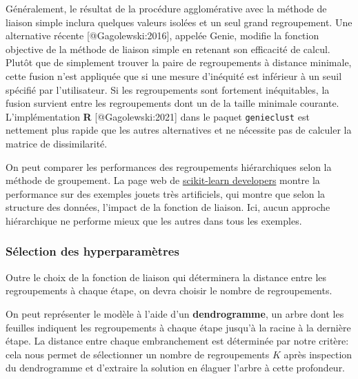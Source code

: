 \documentclass[
  11pt,
  letterpaper,
]{book}
\theoremstyle{definition}
\theoremstyle{remark}
\begin{document}
Généralement, le résultat de la procédure agglomérative avec la méthode
de liaison simple inclura quelques valeurs isolées et un seul grand
regroupement. Une alternative récente {[}@Gagolewski:2016{]}, appelée
Genie, modifie la fonction objective de la méthode de liaison simple en
retenant son efficacité de calcul. Plutôt que de simplement trouver la
paire de regroupements à distance minimale, cette fusion n'est appliquée
que si une mesure d'inéquité est inférieur à un seuil spécifié par
l'utilisateur. Si les regroupements sont fortement inéquitables, la
fusion survient entre les regroupements dont un de la taille minimale
courante. L'implémentation \textbf{R} {[}@Gagolewski:2021{]} dans le
paquet \texttt{genieclust} est nettement plus rapide que les autres
alternatives et ne nécessite pas de calculer la matrice de
dissimilarité.

On peut comparer les performances des regroupements hiérarchiques selon
la méthode de groupement. La page web de
\href{https://scikit-learn.org/stable/auto_examples/cluster/plot_linkage_comparison.html}{scikit-learn
developers} montre la performance sur des exemples jouets très
artificiels, qui montre que selon la structure des données, l'impact de
la fonction de liaison. Ici, aucun approche hiérarchique ne performe
mieux que les autres dans tous les exemples.

\hypertarget{suxe9lection-des-hyperparamuxe8tres}{%
\subsubsection{Sélection des
hyperparamètres}\label{suxe9lection-des-hyperparamuxe8tres}}

Outre le choix de la fonction de liaison qui déterminera la distance
entre les regroupements à chaque étape, on devra choisir le nombre de
regroupements.

On peut représenter le modèle à l'aide d'un \textbf{dendrogramme}, un
arbre dont les feuilles indiquent les regroupements à chaque étape
jusqu'à la racine à la dernière étape. La distance entre chaque
embranchement est déterminée par notre critère: cela nous permet de
sélectionner un nombre de regroupements \(K\) après inspection du
dendrogramme et d'extraire la solution en élaguer l'arbre à cette
profondeur.
\end{document}
